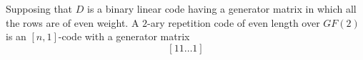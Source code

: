 \qsubpart
\begin{comment}
Supposing that $D$ is a binary linear code having a generator matrix
in which all the rows are of even weight. Then, to prove that all the codewords of $D$ have even weight consider the following.

\[
	w(\bm{a} + \bm{b}) = w(\bm{a}) + w(\bm{b}) - 2w(\bm{a} \cap \bm{b})
\]
\begin{align*}
	w\left(\bm{a} + \bm{b} + \bm{c}\right) &= w(\bm{a} + \bm{b}) + w(\bm{c}) -2w((\bm{a} + \bm{b})\cap \bm{c})\\
&=w(\bm{a}) + w(\bm{b}) - 2w(\bm{a} \cap \bm{b}) + w(\bm{c}) -2w((\bm{a} + \bm{b})\cap \bm{c})\\
&=w(\bm{a}) + w(\bm{b}) + w(\bm{c}) - 2w(\bm{a} \cap \bm{b})  -2w((\bm{a} + \bm{b})\cap \bm{c})\\
&=w(\bm{a}) + w(\bm{b}) + w(\bm{c}) - 2w(\bm{a}\cdot\bm{b})  -2w(\bm{a}\cdot \bm{c} + \bm{b}\cdot \bm{c})\\
&=w(\bm{a}) + w(\bm{b}) + w(\bm{c}) - 2w(\bm{a}\bm{b})  -2w(\bm{a}\bm{c} + \bm{b}\bm{c})\\
\end{align*}
\begin{align*}
	w\left((\bm{a} + \bm{b} + \bm{c}) + \bm{d}\right) &= w(\bm{a} + \bm{b} + \bm{c}) + w(\bm{d}) -2w((\bm{a} + \bm{b} + \bm{c})\cap \bm{d})
\end{align*}	
\begin{align*}
	&= w(\bm{a}) + w(\bm{b}) + w(\bm{c}) - 2w(\bm{a}\bm{b})  -2w(\bm{a}\bm{c} + \bm{b}\bm{c})+ w(\bm{d}) -2w((\bm{a} + \bm{b} + \bm{c})\cap \bm{d})\\
	&= w(\bm{a}) + w(\bm{b}) + w(\bm{c}) + w(\bm{d}) - 2w(\bm{a}\bm{b})  -2w(\bm{a}\bm{c} + \bm{b}\bm{c})-2w((\bm{a} + \bm{b} + \bm{c})\cap \bm{d})\\
	&= w(\bm{a}) + w(\bm{b}) + w(\bm{c}) + w(\bm{d}) - 2w(\bm{a}\bm{b})  -2w(\bm{a}\bm{c} + \bm{b}\bm{c})-2w(\bm{a}\bm{d} + \bm{b}\bm{d} + \bm{c}\bm{d})\\
\end{align*}

Prove that, in a binary linear code, either all the 
codewords have even weight or exactly half have even weight
and half have odd weight.
\end{comment}
Supposing that $D$ is a binary linear code having a generator matrix
in which all the rows are of even weight. A $2$-ary repetition code of even length over $GF(2)$ is an $[n,1]$-code with a generator matrix
\[
	\left[11\ldots1\right]
\]
